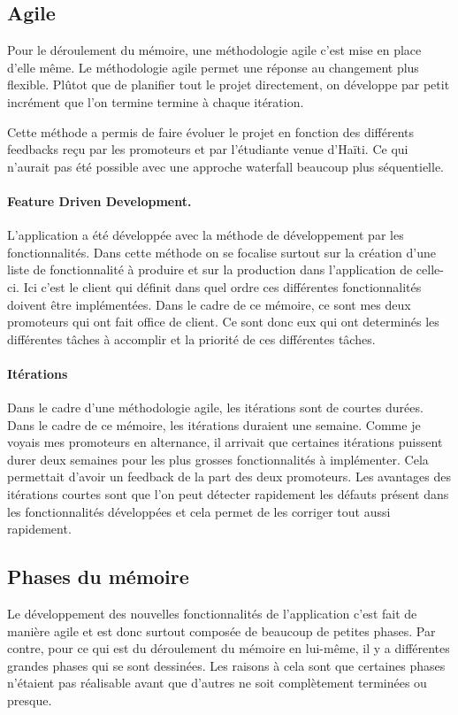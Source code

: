\documentclass{EPL-master-thesis-covers-FR}
\begin{document}
			\subsection*{Agile}
				Pour le déroulement du mémoire, une méthodologie agile c'est mise en place d'elle même.
				Le méthodologie agile permet une réponse au changement plus flexible. Plûtot que de planifier tout le projet directement, on développe par petit incrément que l'on termine termine à chaque itération. 
				
				Cette méthode a permis de faire évoluer le projet en fonction des différents feedbacks reçu par les promoteurs et par l'étudiante venue d'Haïti. Ce qui n'aurait pas été possible avec une approche waterfall beaucoup plus séquentielle.
				
			
				\paragraph*{Feature Driven Development.} L'application a été développée avec la méthode de développement par les fonctionnalités. Dans cette méthode on se focalise surtout sur la création d'une liste de fonctionnalité à produire et sur la production dans l'application de celle-ci. Ici c'est le client qui définit dans quel ordre ces différentes fonctionnalités doivent être implémentées. Dans le cadre de ce mémoire, ce sont mes deux promoteurs qui ont fait office de client. Ce sont donc eux qui ont determinés les différentes tâches à accomplir et la priorité de ces différentes tâches. 
				
				\paragraph*{Itérations} Dans le cadre d'une méthodologie agile, les itérations sont de courtes durées. Dans le cadre de ce mémoire, les itérations duraient une semaine. Comme je voyais mes promoteurs en alternance, il arrivait que certaines itérations puissent durer deux semaines pour les plus grosses fonctionnalités à implémenter. Cela permettait d'avoir un feedback de la part des deux promoteurs.
				Les avantages des itérations courtes sont que l'on peut détecter rapidement les défauts présent dans les fonctionnalités développées et cela permet de les corriger tout aussi rapidement. 

				

			\subsection*{Phases du mémoire}
				Le développement des nouvelles fonctionnalités de l'application c'est fait de manière agile et est donc surtout composée de beaucoup de petites phases. Par contre, pour ce qui est du déroulement du mémoire en lui-même, il y a différentes grandes phases qui se sont dessinées.
			Les raisons à cela sont que certaines phases n'étaient pas réalisable avant que d'autres ne soit complètement terminées ou presque. 
			
\end{document}
